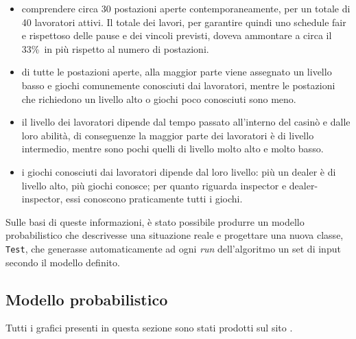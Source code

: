 \begin{itemize}
    \item comprendere circa 30 postazioni aperte contemporaneamente, per un totale di 40 lavoratori attivi. Il totale dei lavori, per garantire quindi uno schedule fair e rispettoso delle pause e dei vincoli previsti, doveva ammontare a circa il 33\%\ in più rispetto al numero di postazioni.
    \item di tutte le postazioni aperte, alla maggior parte viene assegnato un livello basso e giochi comunemente conosciuti dai lavoratori, mentre le postazioni che richiedono un livello alto o giochi poco conosciuti sono meno.
    \item il livello dei lavoratori dipende dal tempo passato all'interno del casinò e dalle loro abilità, di conseguenze la maggior parte dei lavoratori è di livello intermedio, mentre sono pochi quelli di livello molto alto e molto basso.
    \item i giochi conosciuti dai lavoratori dipende dal loro livello: più un dealer è di livello alto, più giochi conosce; per quanto riguarda inspector e dealer-inspector, essi conoscono praticamente tutti i giochi.
\end{itemize}
Sulle basi di queste informazioni, è stato possibile produrre un modello probabilistico che descrivesse una situazione reale e progettare una nuova classe, \texttt{Test}, che generasse automaticamente ad ogni \textit{run} dell'algoritmo un set di input secondo il modello definito.

\subsection{Modello probabilistico}

Tutti i grafici presenti in questa sezione sono stati prodotti sul sito .
